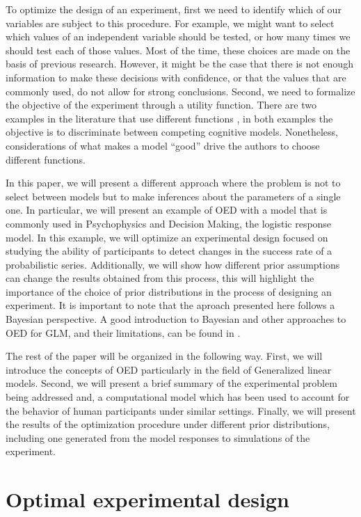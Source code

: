 \documentclass[preprint,review,12pt]{elsarticle}
\begin{document}
To optimize the design of an experiment, first we need to identify which of our variables are subject to this procedure. For example, we might want to select which values of an independent variable should be tested, or how many times we should test each of those values. Most of the time, these choices are made on the basis of previous research. However, it might be the case that there is not enough information to make these decisions with confidence, or that the values that are commonly used, do not allow for strong conclusions. Second, we need to formalize the objective of the experiment through a utility function. There are two examples in the literature that use different functions \citep[][e.g.]{Myung2009,ZL2010}, in both examples the objective is to discriminate between competing cognitive models. Nonetheless, considerations of what makes a model ``good'' drive the authors to choose different functions. 

In this paper, we will present a different approach where the problem is not to select between models but to make inferences about the parameters of a single one. In particular, we will present an example of OED with a model that is commonly used in Psychophysics and Decision Making, the logistic response model. %
In this example, we will optimize an experimental design focused on studying the ability of participants to detect changes in the success rate of a probabilistic series. Additionally, we will show how different prior assumptions can change the results obtained from this process, this will highlight the importance of the choice of prior distributions in the process of designing an experiment. It is important to note that the aproach presented here follows a Bayesian perspective. A good introduction to Bayesian and other approaches to OED for GLM, and their limitations, can be found in \citet{khurietal2006}.

The rest of the paper will be organized in the following way. First, we will introduce the concepts of OED particularly in the field of Generalized linear models. Second, we will present a brief summary of the experimental problem being addressed and, a computational model which has been used to account for the behavior of human participants under similar settings. Finally, we will present the results of the optimization procedure under different prior distributions, including one generated from the model responses to simulations of the experiment.

\section{Optimal experimental design}
\end{document}
